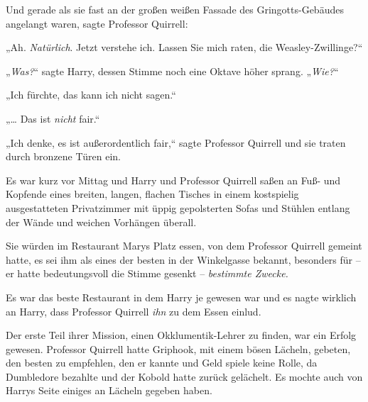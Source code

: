 Und gerade als sie fast an der großen weißen Fassade des Gringotts-Gebäudes angelangt waren, sagte Professor Quirrell:

„Ah. \emph{Natürlich}. Jetzt verstehe ich. Lassen Sie mich raten, die Weasley-Zwillinge?“

„\emph{Was?}“ sagte Harry, dessen Stimme noch eine Oktave höher sprang. „\emph{Wie?}“

„Ich fürchte, das kann ich nicht sagen.“

„… Das ist \emph{nicht} fair.“

„Ich denke, es ist außerordentlich fair,“ sagte Professor Quirrell und sie traten durch bronzene Türen ein.

\later

Es war kurz vor Mittag und Harry und Professor Quirrell saßen an Fuß- und Kopfende eines breiten, langen, flachen Tisches in einem kostspielig ausgestatteten Privatzimmer mit üppig gepolsterten Sofas und Stühlen entlang der Wände und weichen Vorhängen überall.

Sie würden im Restaurant Marys Platz essen, von dem Professor Quirrell gemeint hatte, es sei ihm als eines der besten in der Winkelgasse bekannt, besonders für -- er hatte bedeutungsvoll die Stimme gesenkt -- \emph{bestimmte Zwecke.}

Es war das beste Restaurant in dem Harry je gewesen war und es nagte wirklich an Harry, dass Professor Quirrell \emph{ihn} zu dem Essen einlud.

Der erste Teil ihrer Mission, einen Okklumentik-Lehrer zu finden, war ein Erfolg gewesen. Professor Quirrell hatte Griphook, mit einem bösen Lächeln, gebeten, den besten zu empfehlen, den er kannte und Geld spiele keine Rolle, da Dumbledore bezahlte und der Kobold hatte zurück gelächelt. Es mochte auch von Harrys Seite einiges an Lächeln gegeben haben.


